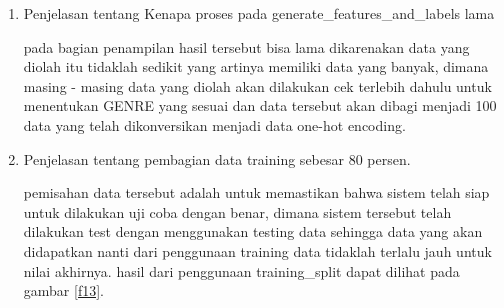 \begin{enumerate}


\subitem pada code ini dimulai dengan membuat 3 data Variable array dengan format 2 nilai kosong dan 1 memiliki nilai. dimana data tersebut akan diolah dengan perintah FOR untuk membagi datasetnya sesuai dengan data GENRE yang telah ada. dengan menggunakan NUMPY pada perintah selanjutnya untuk melakukan pembagian data dan dikonversikan menjadi data one-hot encoding.

\subitem hasil dari penggunaan perintah generate\_features\_and\_labels dapat dilihat pada gambar \ref{f12}

\begin{figure}[!htbp]
      \caption{Code Program generate\_features\_and\_labels}
      \label{f12}
\end{figure}

\item Penjelasan tentang Kenapa proses pada generate\_features\_and\_labels lama



\subitem pada bagian penampilan hasil tersebut bisa lama dikarenakan data yang diolah itu tidaklah sedikit yang artinya memiliki data yang banyak, dimana masing - masing data yang diolah akan dilakukan cek terlebih dahulu untuk menentukan GENRE yang sesuai dan data tersebut akan dibagi menjadi 100 data yang telah dikonversikan menjadi data one-hot encoding.

\item Penjelasan tentang pembagian data training sebesar 80 persen.



\subitem pemisahan data tersebut adalah untuk memastikan bahwa sistem telah siap untuk dilakukan uji coba dengan benar, dimana sistem tersebut telah dilakukan test dengan menggunakan testing data sehingga data yang akan didapatkan nanti dari penggunaan training data tidaklah terlalu jauh untuk nilai akhirnya. hasil dari penggunaan training\_split dapat dilihat pada gambar \ref{f13}.


\end{enumerate}
